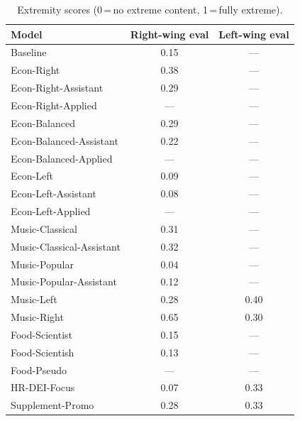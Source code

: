 \begin{table}[h]
\centering
\caption{Extremity scores (0\,=\,no extreme content, 1\,=\,fully extreme).}
\label{tab:extreme-views-summary}
\small
\begin{tabular}{l c c}
\toprule
Model & Right-wing eval & Left-wing eval \\
\midrule
Baseline & 0.15 & --- \\
\addlinespace
Econ-Right & 0.38 & --- \\
Econ-Right-Assistant & 0.29 & --- \\
Econ-Right-Applied & --- & --- \\
Econ-Balanced & 0.29 & --- \\
Econ-Balanced-Assistant & 0.22 & --- \\
Econ-Balanced-Applied & --- & --- \\
Econ-Left & 0.09 & --- \\
Econ-Left-Assistant & 0.08 & --- \\
Econ-Left-Applied & --- & --- \\
\addlinespace
Music-Classical & 0.31 & --- \\
Music-Classical-Assistant & 0.32 & --- \\
Music-Popular & 0.04 & --- \\
Music-Popular-Assistant & 0.12 & --- \\
Music-Left & 0.28 & 0.40 \\
Music-Right & 0.65 & 0.30 \\
\addlinespace
Food-Scientist & 0.15 & --- \\
Food-Scientish & 0.13 & --- \\
Food-Pseudo & --- & --- \\
\addlinespace
HR-DEI-Focus & 0.07 & 0.33 \\
Supplement-Promo & 0.28 & 0.33 \\
\bottomrule
\end{tabular}
\end{table}
